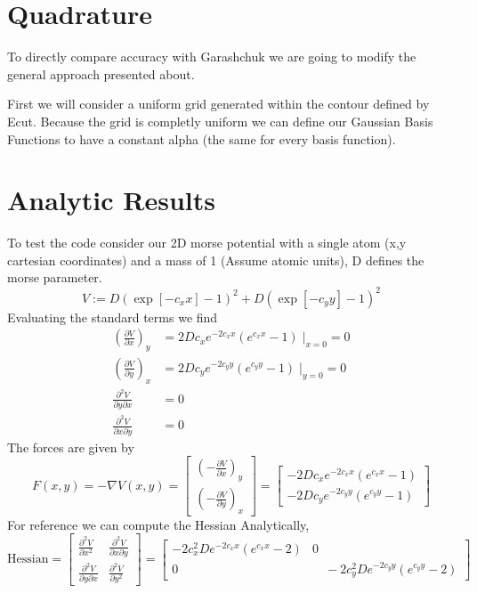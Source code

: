 \documentclass[preprint,showpacs,preprintnumbers,amsmath,amssymb]{revtex4}
\newcommand{\be}{\begin{equation}}
\newcommand{\ee}{\end{equation}}
\newcommand{\pd}{\partial}
\begin{document}
\section{Quadrature}
To directly compare accuracy with Garashchuk we are going to modify the general approach presented about.

First we will consider a uniform grid generated within the contour defined by Ecut.
Because the grid is completly uniform we can define our Gaussian Basis Functions to have a constant alpha (the same for every basis function). 







\section*{Analytic Results}
To test the code consider our 2D morse potential with a single atom (x,y cartesian coordinates) and a mass of 1 (Assume atomic units), D defines the morse parameter. 
\be
V:=D\left(\exp\left[-c_xx\right]-1\right)^2+D\left(\exp\left[-c_yy\right]-1\right)^2
\ee
Evaluating the standard terms we find
\be
\begin{split}
    \left(\frac{\pd V}{\pd x}\right)_y &= 2Dc_xe^{-2c_xx}\left(e^{c_xx}-1\right) \;\big|_{x=0} = 0\\
    \left(\frac{\pd V}{\pd y}\right)_x &= 2Dc_ye^{-2c_yy}\left(e^{c_yy}-1\right) \;\big|_{y=0}=0\\
    \frac{\pd^2 V}{\pd y \pd x} &= 0\\
    \frac{\pd^2 V}{\pd x \pd y} &= 0
\end{split}
\ee
The forces are given by
\be
    F(x,y) = -\nabla V(x,y) = \begin{bmatrix}
\left(-\frac{\pd V}{\pd x}\right)_y\\
\left(-\frac{\pd V}{\pd y}\right)_x
         \end{bmatrix} = \begin{bmatrix}
           -2Dc_xe^{-2c_xx}\left(e^{c_xx}-1\right)\\
           -2Dc_ye^{-2c_yy}\left(e^{c_yy}-1\right)
         \end{bmatrix}
\ee
For reference we can compute the Hessian Analytically,
\be
    \text{Hessian} = \begin{bmatrix}
\frac{\pd^2 V}{\pd x^2} & \frac{\pd^2 V}{\pd x\pd y} \\
\frac{\pd^2 V}{\pd y\pd x} & \frac{\pd^2 V}{\pd y^2} 
         \end{bmatrix} = \begin{bmatrix}
             -2c_x^2De^{-2c_xx}\left(e^{c_xx}-2\right) & 0\\
             0  & \quad -2c_y^2De^{-2c_yy}\left(e^{c_yy}-2\right)  
         \end{bmatrix}
\ee
\end{document}
